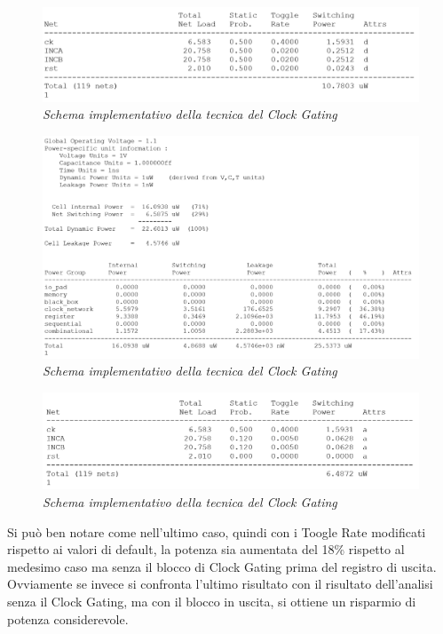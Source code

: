 \begin{figure}[!htb]
	\centering
	\includegraphics[scale=0.65]{immagini/elsif7}
	\caption{\textit{Schema implementativo della tecnica del Clock Gating}}
	\label{elsif7}
\end{figure}
\begin{figure}[!htb]
	\centering
	\includegraphics[scale=0.65]{immagini/elsif8}
	\caption{\textit{Schema implementativo della tecnica del Clock Gating}}
	\label{elsif8}
\end{figure}
\begin{figure}[!htb]
	\centering
	\includegraphics[scale=0.65]{immagini/elsif9}
	\caption{\textit{Schema implementativo della tecnica del Clock Gating}}
	\label{elsif9}
\end{figure}
\newpage
\noindent Si può ben notare come nell'ultimo caso, quindi con i Toogle Rate modificati rispetto ai valori di default, la potenza sia aumentata del 18\% rispetto al medesimo caso ma senza il blocco di Clock Gating prima del registro di uscita. Ovviamente se invece si confronta l'ultimo risultato con il risultato dell'analisi senza il Clock Gating, ma con il blocco in uscita, si ottiene un risparmio di potenza considerevole.\\
